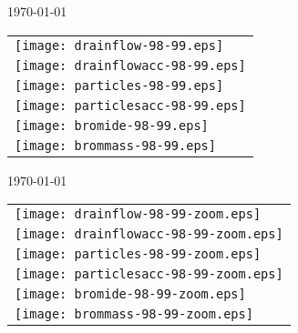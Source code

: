 \documentclass[a4paper]{article}
\begin{document}
\newpage
\today \\
%
\begin{tabular}{l}
\texttt{[image: drainflow-98-99.eps]} \\
\texttt{[image: drainflowacc-98-99.eps]} \\
\texttt{[image: particles-98-99.eps]} \\
\texttt{[image: particlesacc-98-99.eps]} \\
\texttt{[image: bromide-98-99.eps]} \\
\texttt{[image: brommass-98-99.eps]}
\end{tabular}

\newpage
\today \\
%
\begin{tabular}{l}
\texttt{[image: drainflow-98-99-zoom.eps]} \\
\texttt{[image: drainflowacc-98-99-zoom.eps]} \\
\texttt{[image: particles-98-99-zoom.eps]} \\
\texttt{[image: particlesacc-98-99-zoom.eps]} \\
\texttt{[image: bromide-98-99-zoom.eps]} \\
\texttt{[image: brommass-98-99-zoom.eps]}
\end{tabular}
\end{document}
